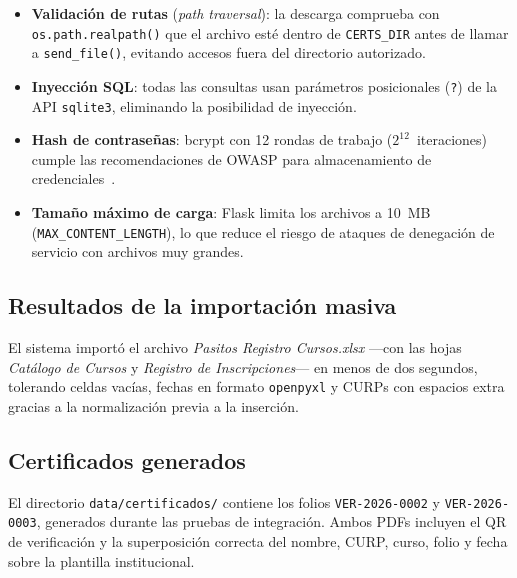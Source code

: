 \documentclass[11pt,letterpaper]{article}
\begin{document}
\begin{itemize}
  \item \textbf{Validaci\'on de rutas} (\textit{path traversal}): la descarga
        comprueba con \texttt{os.path.realpath()} que el archivo est\'e dentro de
        \texttt{CERTS\_DIR} antes de llamar a \texttt{send\_file()}, evitando
        accesos fuera del directorio autorizado.

  \item \textbf{Inyecci\'on SQL}: todas las consultas usan par\'ametros
        posicionales (\texttt{?}) de la API \texttt{sqlite3}, eliminando la
        posibilidad de inyecci\'on.

  \item \textbf{Hash de contrase\~nas}: bcrypt con 12 rondas de trabajo
        ($2^{12}$~iteraciones) cumple las recomendaciones de OWASP para
        almacenamiento de credenciales~\cite{owasp}.

  \item \textbf{Tama\~no m\'aximo de carga}: Flask limita los archivos a
        10~MB (\texttt{MAX\_CONTENT\_LENGTH}), lo que reduce el riesgo de
        ataques de denegaci\'on de servicio con archivos muy grandes.
\end{itemize}

\subsection{Resultados de la importaci\'on masiva}

El sistema import\'o el archivo \textit{Pasitos Registro Cursos.xlsx} ---con las
hojas \textit{Cat\'alogo de Cursos} y \textit{Registro de Inscripciones}--- en
menos de dos segundos, tolerando celdas vac\'ias, fechas en formato \texttt{openpyxl}
y CURPs con espacios extra gracias a la normalizaci\'on previa a la inserci\'on.

\subsection{Certificados generados}

El directorio \texttt{data/certificados/} contiene los folios
\texttt{VER-2026-0002} y \texttt{VER-2026-0003}, generados durante las pruebas de
integraci\'on. Ambos PDFs incluyen el QR de verificaci\'on y la superposici\'on
correcta del nombre, CURP, curso, folio y fecha sobre la plantilla institucional.

\end{document}
